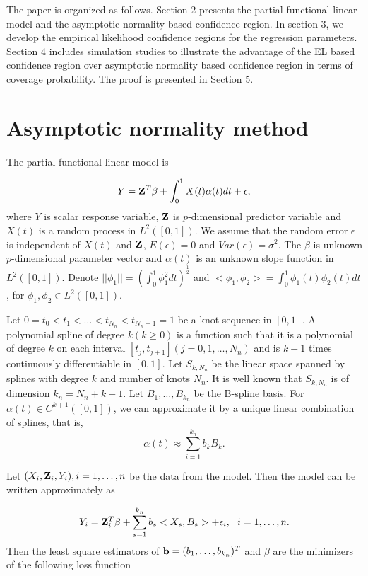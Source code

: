 \documentclass[preprint,12pt]{elsarticle}
\begin{document}
	The paper is organized as follows. Section 2 presents the partial functional linear model and the asymptotic normality based confidence region. In section 3, we develop the empirical likelihood confidence regions for the regression parameters. Section 4 includes simulation studies to illustrate the advantage of the EL based confidence region over asymptotic normality based confidence region in terms of coverage probability. The proof is presented in Section 5. 





	\section{Asymptotic normality method}
	
	The partial functional linear model is 
	
	\[Y={\bf Z}^T{\bf\beta}+\int_0^1X(t)\alpha(t)dt+\epsilon,\]
	where $Y$ is scalar response variable, ${\bf Z}$ is $p$-dimensional predictor variable and $X(t)$ is a random process in $L^2([0,1])$. We assume that the random error $\epsilon$ is independent of $X(t)$ and ${\bf Z}$, $E(\epsilon)=0$ and $Var(\epsilon)=\sigma^2$. The $\beta$ is unknown $p$-dimensional parameter vector and $\alpha(t)$ is an unknown slope function in $L^2([0,1])$.	
	 Denote $||\phi_1||=(\int_0^1\phi_1^2dt)^{\frac{1}{2}}$ and $<\phi_1, \phi_2>=\int_0^1\phi_1(t)\phi_2(t)dt$, for $\phi_1,\phi_2\in L^2([0,1])$.
	 
		Let $0=t_0<t_1<\dots<t_{N_n}<t_{N_n+1}=1$ be a knot sequence in $[0,1]$. A polynomial spline of degree $k(k\geq 0)$ is a function such that it is a polynomial of degree $k$ on each interval $[t_j,t_{j+1}](j=0,1,\dots,N_n)$ and is $k-1$ times continuously differentiable in $[0,1]$. Let $S_{k,N_n}$ be the linear space spanned by splines with degree $k$ and number of knots $N_n$. It is well known that $S_{k,N_n}$ is of dimension $k_n=N_n+k+1$. Let $B_1,\dots, B_{k_n}$ be the B-spline basis. For $\alpha(t)\in C^{k+1}([0,1])$, we can approximate it by a unique linear combination of splines, that is,
	\[\alpha(t)\approx\sum_{i=1}^{k_n}b_kB_k.\]
	
	Let $(X_i, {\bf Z}_i, Y_i), i=1,\dots,n$ be the data from the model. Then the model can be written approximately as 
	
	\[Y_i={\bf Z}_i^T\beta+\sum_{s=1}^{k_n}b_s<X_s,B_s>+\epsilon_i,\ \ i=1,\dots,n.\]	
	Then the least square estimators of ${\bf b}=(b_1,\dots,b_{k_n})^T$ and $\beta$ are the minimizers of the following loss function
	
\end{document}
